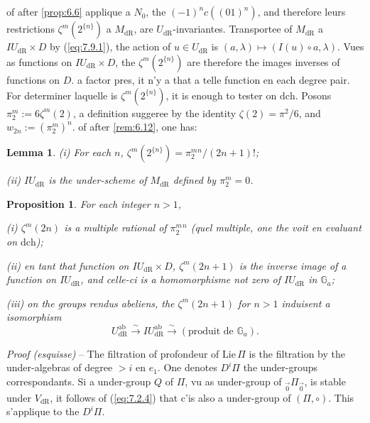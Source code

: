 \documentclass[11pt,a4paper]{article}
\theoremstyle{plain}
\newtheorem{lemma}[theorem]{Lemma}
\newtheorem{proposition}[theorem]{Proposition}
\theoremstyle{definition}
\newcommand{\Ga}{\mathbb{G}_a}
\newcommand{\dR}{\mathrm{dR}}
\newcommand{\ab}{\mathrm{ab}}
\begin{document}
\subsection{}\label{ssec:7.10}

of after \ref{prop:6.6} applique a $N_0$, the $(-1)^n c((01)^n)$, and therefore leurs restrictions $\zeta^m(2^{\{n\}})$ a $M_{\dR}$, are $U_{\dR}$-invariantes. Transportee of $M_{\dR}$ a $IU_{\dR} \times D$ by (\ref{eq:7.9.1}), the action of $u \in U_{\dR}$ is $(a,\lambda) \mapsto (I(u) \circ a, \lambda)$. Vues as functions on $IU_{\dR} \times D$, the $\zeta^m(2^{\{n\}})$ are therefore the images inverses of functions on $D$. a factor pres, it n'y a that a telle function en each degree pair. For determiner laquelle is $\zeta^m(2^{\{n\}})$, it is enough to tester on $\mathrm{dch}$. Posons $\pi_2^m := 6 \zeta^m(2)$, a definition suggeree by the identity $\zeta(2) = \pi^2/6$, and $w_{2n} := (\pi_2^m)^n$. of after \ref{rem:6.12}, one has:

\begin{lemma}\label{lem:7.11}
(i) For each $n$, $\zeta^m(2^{\{n\}}) = \pi_2^m{}^n/(2n+1)!$;

(ii) $IU_{\dR}$ is the under-scheme of $M_{\dR}$ defined by $\pi_2^m = 0$.
\end{lemma}

\begin{proposition}\label{prop:7.12}
For each integer $n > 1$,

(i) $\zeta^m(2n)$ is a multiple rational of $\pi_2^m{}^n$ (quel multiple, one the voit en evaluant on $\mathrm{dch}$);

(ii) en tant that function on $IU_{\dR} \times D$, $\zeta^m(2n+1)$ is the inverse image of a function on $IU_{\dR}$, and celle-ci is a homomorphisme not zero of $IU_{\dR}$ in $\Ga$;

(iii) on the groups rendus abeliens, the $\zeta^m(2n+1)$ for $n > 1$ induisent a isomorphism
\[
U_{\dR}^{\ab} \xrightarrow{\sim} IU_{\dR}^{\ab} \xrightarrow{\sim} (\text{produit de } \Ga).
\]
\end{proposition}

\noindent \textit{Proof (esquisse)} -- The filtration of profondeur of $\mathrm{Lie}\,\Pi$ is the filtration by the under-algebras of degree $> i$ en $e_1$. One denotes $D^i \Pi$ the under-groups correspondants. Si a under-group $Q$ of $\Pi$, vu as under-group of ${}_{\vec{0}}\Pi_{\vec{0}}$, is stable under $V_{\dR}$, it follows of (\ref{eq:7.2.4}) that c'is also a under-group of $(\Pi, \circ)$. This s'applique to the $D^i \Pi$.
\end{document}
